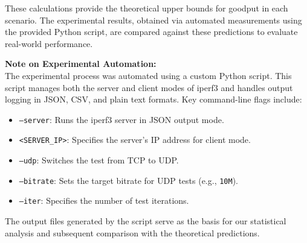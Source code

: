These calculations provide the theoretical upper bounds for goodput in each scenario. The experimental results, obtained via automated measurements using the provided Python script, are compared against these predictions to evaluate real-world performance.

\medskip

\textbf{Note on Experimental Automation:} \\
The experimental process was automated using a custom Python script. This script manages both the server and client modes of iperf3 and handles output logging in JSON, CSV, and plain text formats. Key command-line flags include:
\begin{itemize}
    \item \texttt{--server}: Runs the iperf3 server in JSON output mode.
    \item \texttt{<SERVER\_IP>}: Specifies the server's IP address for client mode.
    \item \texttt{--udp}: Switches the test from TCP to UDP.
    \item \texttt{--bitrate}: Sets the target bitrate for UDP tests (e.g., \texttt{10M}).
    \item \texttt{--iter}: Specifies the number of test iterations.
\end{itemize}
The output files generated by the script serve as the basis for our statistical analysis and subsequent comparison with the theoretical predictions.
